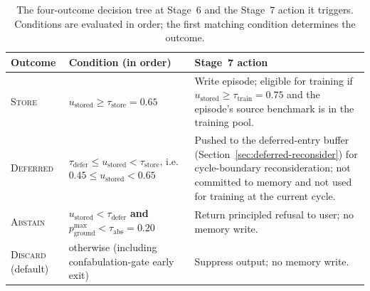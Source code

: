 \begin{table}[tbp]
\centering
\caption{The four-outcome decision tree at Stage~6 and the Stage~7 action it triggers. Conditions are evaluated in order; the first matching condition determines the outcome.}
\label{tab:decision-tree}
\small
\begin{tabular}{@{}p{1.8cm}p{6.2cm}p{5.6cm}@{}}
\toprule
\textbf{Outcome} & \textbf{Condition (in order)} & \textbf{Stage~7 action} \\
\midrule
\textsc{Store}        & $u_{\text{stored}} \geq \tau_{\text{store}} = 0.65$ & Write episode; eligible for training if $u_{\text{stored}} \geq \tau_{\text{train}} = 0.75$ and the episode's source benchmark is in the training pool. \\
\addlinespace[2pt]
\textsc{Deferred}     & $\tau_{\text{defer}} \leq u_{\text{stored}} < \tau_{\text{store}}$, i.e.\ $0.45 \leq u_{\text{stored}} < 0.65$ & Pushed to the deferred-entry buffer (Section~\ref{sec:deferred-reconsider}) for cycle-boundary reconsideration; not committed to memory and not used for training at the current cycle. \\
\addlinespace[2pt]
\textsc{Abstain}      & $u_{\text{stored}} < \tau_{\text{defer}}$ \textbf{and} $p_{\text{ground}}^{\max} < \tau_{\text{abs}} = 0.20$ & Return principled refusal to user; no memory write. \\
\addlinespace[2pt]
\textsc{Discard} (default) & otherwise (including confabulation-gate early exit) & Suppress output; no memory write. \\
\bottomrule
\end{tabular}
\end{table}

